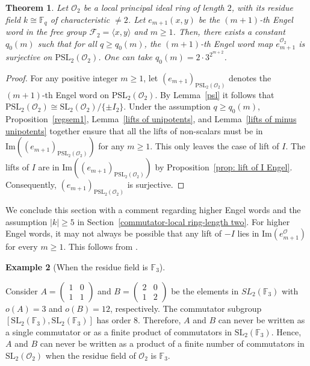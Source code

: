 \documentclass[10pt,twoside]{amsart}
\newcommand{\SL}{\mathrm{SL}}
\newcommand{\im}{\mathrm{Im}}
\newcommand{\R}{\mathcal{O}_2}
\newtheorem{theorem}{Theorem}[section]
\theoremstyle{definition}
\theoremstyle{definition}
\newtheorem{example}[theorem]{Example}
\begin{document}
\begin{theorem}{\label{th: Engel PSL2}}
Let $\mathcal{O}_2$ be a local principal ideal ring of length $2$, with its residue field $k\cong \mathbb{F}_q$ of characteristic $\neq 2$. Let $e_{m+1}(x,y)$ be the $(m+1)$-th Engel word in the free group $\mathcal F_2=\langle x,y\rangle$ and $m\geq 1$. Then, there exists a constant $q_0(m)$ such that for all $q\geq q_0(m)$, the $(m+1)$-th Engel word map $e_{m+1}^{\mathcal{O}_2}$ is surjective on  $\mathrm{P}\SL_2(\mathcal{O}_2)$. One can take $q_0(m) = 2\cdot3^{2^{m+2}}$.   
\end{theorem}
\begin{proof}
For any positive integer $m\geq 1$, let $(e_{m+1})_{\mathrm{PSL}_2(\mathcal{O}_2)}$ denotes the $(m+1)$-th Engel word on $\mathrm{PSL}_2(\mathcal{O}_2)$. By Lemma~\ref{psl} it follows that $\mathrm{PSL}_2(\mathcal{O}_2) \cong \SL_2(\mathcal{O}_2)/ \{\pm I_2\}$. Under the assumption $q\geq q_0(m)$, Proposition~\ref{regsem1}, Lemma~\ref{lifts of unipotents}, and Lemma~\ref{lifts of minus unipotents} together ensure that all the lifts of non-scalars must be in $\im ((e_{m+1})_{\mathrm{PSL}_2(\mathcal{O}_2)})$ for any $m\geq 1$. This only leaves the case of lift of $I$. The lifts of $I$ are in $\im ((e_{m+1})_{\mathrm{PSL}_2(\mathcal{O}_2)})$ by Proposition~\ref{prop: lift of I Engel}. Consequently, $(e_{m+1})_{\mathrm{PSL}_2(\mathcal{O}_2)}$ is surjective.
\end{proof}

We conclude this section with a comment regarding 
higher Engel words and the assumption $|k| \geq 5$ in Section~\ref{commutator-local ring-length two}. For higher Engel words, it may not always be possible that any lift of $-I$ lies in $\im(e_{m+1}^{\mathcal{O}})$ for every $m\geq 1$. This follows from \cite[Proposition 4.7]{BandmanGarionGrunewald2012}.
\begin{example}[When the residue field is $\mathbb{F}_3$]{\label{F_3 case}}

Consider $A=\left(\begin{array}{cc} 1  &  0\\ 1  & 1
\end{array}\right)$ and $B = \left(\begin{array}{cc} 2  &0  \\
1 & 2 \end{array}\right)$ be the elements in $SL_2(\mathbb{F}_3)$ with $o(A)=3$ and $o(B)=12$, respectively. The commutator subgroup $[\SL_2(\mathbb{F}_3), \SL_2(\mathbb{F}_3)]$ has order $8$. Therefore, $A$ and $B$ can never be written as a single commutator or as a finite product of commutators in $\SL_2(\mathbb{F}_3)$. Hence, $A$ and $B$ can never be written as a product of a finite number of commutators in $\SL_2(\R)$ when the residue field of $\R$ is $\mathbb{F}_3$. 
\end{example}

\printbibliography
\vspace{2em}
\end{document}
